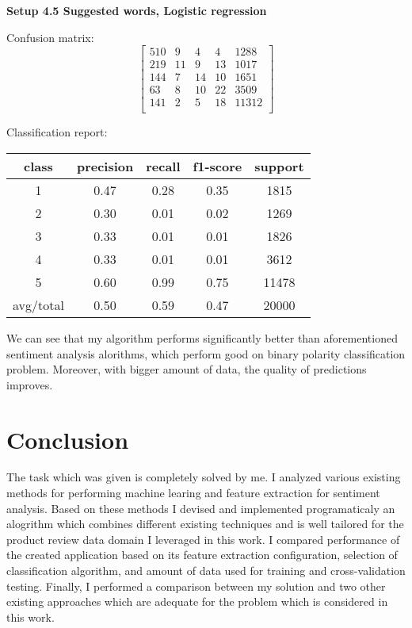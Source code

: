 \documentclass[12pt]{report}
\begin{document}
\textbf{Setup 4.5 Suggested words, Logistic regression}

Confusion matrix:
\[
\begin{bmatrix}
510 & 9 & 4 & 4 & 1288 \\
219 & 11 & 9 & 13 & 1017 \\
144 & 7 & 14 & 10 & 1651 \\
63 & 8 & 10 & 22 & 3509 \\
141 & 2 & 5 & 18 & 11312 \\
\end{bmatrix}
\]

Classification report:

\begin{center}
	\begin{tabular}{c | c | c | c | c }
		\hline
		class & precision & recall & f1-score & support \\ \hline
		1 & 0.47 & 0.28 & 0.35 & 1815 \\ \hline
		2 & 0.30 & 0.01 & 0.02 & 1269 \\ \hline
		3 & 0.33 & 0.01 & 0.01 & 1826 \\ \hline
		4 & 0.33 & 0.01 & 0.01 & 3612 \\ \hline
		5 & 0.60 & 0.99 & 0.75 & 11478 \\ \hline
		avg/total & 0.50 & 0.59 & 0.47 & 20000 \\ \hline
	\end{tabular}
\end{center}

We can see that my algorithm performs significantly better than aforementioned sentiment analysis alorithms, which perform good on binary polarity classification problem. Moreover, with bigger amount of data, the quality of predictions improves.

\newpage

\chapter*{Conclusion}

The task which was given is completely solved by me. I analyzed various existing methods for performing machine learing and feature extraction for sentiment analysis. Based on these methods I devised and implemented programaticaly an alogrithm which combines different existing techniques and is well tailored for the product review data domain I leveraged in this work. I compared performance of the created application based on its feature extraction configuration, selection of classification algorithm, and amount of data used for training and cross-validation testing. Finally, 
I performed a comparison between my solution and two other existing approaches which are adequate for the problem which is considered in this work.
\end{document}
